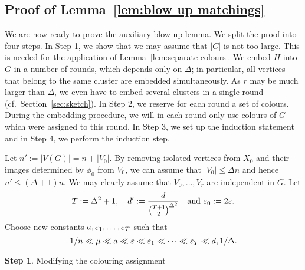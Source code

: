 \documentclass[10pt]{amsart}
\theoremstyle{definition}
\theoremstyle{claimstyle}
\theoremstyle{stepstyle}
\newtheorem{step}{Step}
\numberwithin{equation}{section}
\def\lateproof#1{\removelastskip\penalty55\medskip\noindent\setcounter{claim}{0}\setcounter{step}{0}{\bf Proof of #1. }} %
\begin{document}
\subsection{Proof of Lemma~\ref{lem:blow up matchings}} \label{subsec:main proof}
We are now ready to prove the auxiliary blow-up lemma. We split the proof into four steps.
In Step 1,
we show that we may assume that $|C|$ is not too large. This is needed for the application of Lemma~\ref{lem:separate colours}.
We embed $H$ into $G$ in a number of rounds, which depends only on $\Delta$;
in particular, all vertices that belong to the same cluster are embedded simultaneously.
As $r$ may be much larger than $\Delta$, we even have to embed several clusters in a single round (cf.~Section~\ref{sec:sketch}).
In Step 2, we reserve for each round a set of colours.
During the embedding procedure, we will in each round only use colours of $G$ which were assigned to this round.
In Step 3, we set up the induction statement
and in Step 4, we perform the induction step.




\lateproof{Lemma~\ref{lem:blow up matchings}}
Let $n':=|V(G)|=n+|V_0|$. By removing isolated vertices from $X_0$ and their images determined by $\phi_0$ from $V_0$,
we can assume that $|V_0|\le \Delta n$ and hence $n'\le (\Delta+1)n$.
We may clearly assume that $V_0,\dots,V_r$ are independent in $G$.
Let $$T:=\Delta^2+1,\quad d':=\frac{d}{\binom{T+1}{2}^{\Delta^2}}\quad \mbox{and }{\varepsilon}_0:=2{\varepsilon}.$$
Choose new constants $a,{\varepsilon}_1,\dots,{\varepsilon}_T$ such that $$1/n \ll \mu \ll a \ll {\varepsilon} \ll {\varepsilon}_1 \ll \dots \ll {\varepsilon}_T \ll d,1/\Delta.$$

\begin{NoHyper}
\begin{step}\label{step:linear colours}
Modifying the colouring assignment
\end{step}
\end{NoHyper}
\end{document}
